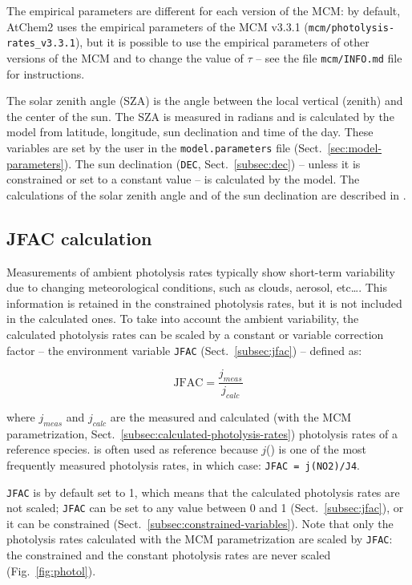 The empirical parameters are different for each version of the MCM: by
default, AtChem2 uses the empirical parameters of the MCM v3.3.1
(\texttt{mcm/photolysis-rates\_v3.3.1}), but it is possible to use the
empirical parameters of other versions of the MCM and to change the
value of $\tau$ -- see the file \texttt{mcm/INFO.md} file for
instructions.

The solar zenith angle (SZA) is the angle between the local vertical
(zenith) and the center of the sun. The SZA is measured in radians and
is calculated by the model from latitude, longitude, sun declination
and time of the day. These variables are set by the user in the
\texttt{model.parameters} file (Sect.~\ref{sec:model-parameters}). The
sun declination (\texttt{DEC}, Sect.~\ref{subsec:dec}) -- unless it is
constrained or set to a constant value -- is calculated by the
model. The calculations of the solar zenith angle and of the sun
declination are described in \citet{madronich_1993}.

\subsection{JFAC calculation} \label{subsec:jfac-calculation}

Measurements of ambient photolysis rates typically show short-term
variability due to changing meteorological conditions, such as clouds,
aerosol, etc\ldots \citep{sommariva_2020}. This information is
retained in the constrained photolysis rates, but it is not included
in the calculated ones. To take into account the ambient variability,
the calculated photolysis rates can be scaled by a constant or
variable correction factor -- the environment variable \texttt{JFAC}
(Sect.~\ref{subsec:jfac}) -- defined as:

\begin{equation}
  \mathrm{JFAC} = \frac{j_{meas}}{j_{calc}}
\end{equation}

where $j_{meas}$ and $j_{calc}$ are the measured and calculated (with
the MCM parametrization, Sect.~\ref{subsec:calculated-photolysis-rates})
photolysis rates of a reference species.  is often used as
reference because $j$() is one of the most frequently measured
photolysis rates, in which case: \verb|JFAC = j(NO2)/J4|.

\texttt{JFAC} is by default set to 1, which means that the calculated
photolysis rates are not scaled; \texttt{JFAC} can be set to any value
between 0 and 1 (Sect.~\ref{subsec:jfac}), or it can be constrained
(Sect.~\ref{subsec:constrained-variables}). Note that only the
photolysis rates calculated with the MCM parametrization are scaled by
\texttt{JFAC}: the constrained and the constant photolysis rates are
never scaled (Fig.~\ref{fig:photol}).

